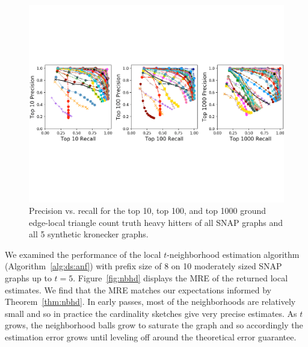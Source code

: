\documentclass{vldb}
\begin{document}
\begin{figure}[t]
\centering
\includegraphics[width=1.7\columnwidth]{precision_recall.pdf}
\caption{Precision vs. recall for the top 10, top 100, and top 1000 ground edge-local triangle count truth heavy hitters of all SNAP graphs and all 5 synthetic kronecker graphs.
}
\label{fig:precision_recall}
\end{figure}

We examined the performance of the local $t$-neighborhood estimation algorithm (Algorithm~\ref{alg:ds:anf}) 
with prefix size of 8 on 10 moderately sized SNAP graphs up to $t = 5$.
Figure~\ref{fig:nbhd} displays the MRE of the returned local estimates. 
We find that the MRE matches our expectations informed by Theorem~\ref{thm:nbhd}. 
In early passes, most of the neighborhoods are relatively small and so in practice the cardinality sketches give very precise estimates. 
As $t$ grows, the neighborhood balls grow to saturate the graph and so accordingly the estimation error grows until leveling off around the theoretical error guarantee.
\end{document}
